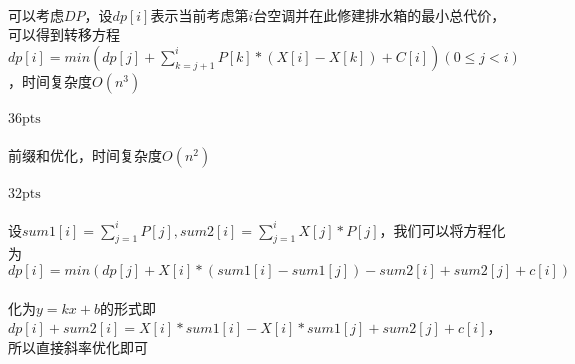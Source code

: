 \documentclass[UTF8]{ctexart}
\begin{document}
\paragraph{}可以考虑$DP$，设$dp[i]$表示当前考虑第$i$台空调并在此修建排水箱的最小总代价，可以得到转移方程$dp[i]=min(dp[j]+\sum_{k=j+1}^{i}P[k]*(X[i]-X[k])+C[i])(0\leq j<i)$，时间复杂度$O(n^3)$
\paragraph{$36\mathrm{pts}$}
\paragraph{}前缀和优化，时间复杂度$O(n^2)$
\paragraph{$32\mathrm{pts}$}
\paragraph{}设$sum1[i]=\sum_{j=1}^{i}P[j],sum2[i]=\sum_{j=1}^{i}X[j]*P[j]$，我们可以将方程化为$dp[i]=min(dp[j]+X[i]*(sum1[i]-sum1[j])-sum2[i]+sum2[j]+c[i])$
\paragraph{}化为$y=kx+b$的形式即$dp[i]+sum2[i]=X[i]*sum1[i]-X[i]*sum1[j]+sum2[j]+c[i]$，所以直接斜率优化即可
\end{document}
